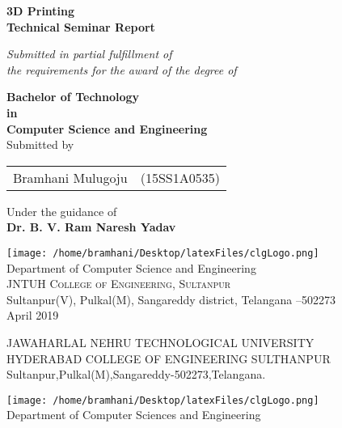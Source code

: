 \documentclass[12pt,a4paper]{report}
\begin{document}
\begin{center}
\Large \textbf {3D Printing}\\[0.5in]
\small {\bf Technical Seminar Report}\vspace{0.5in}

\small \emph{Submitted in partial fulfillment of\\
        the requirements for the award of the degree of}
        \vspace{.2in}

       {\bf Bachelor of Technology \\in\\ Computer Science and Engineering}\\[0.5in]

\normalsize Submitted by \\
\begin{table}[h]
\centering
\begin{tabular}{lr}
Bramhani Mulugoju & (15SS1A0535) \\
\end{tabular}
\end{table}

\vspace{.1in}
Under the guidance of\\
\vspace{.1in}
\textbf{Dr. B. V. Ram Naresh Yadav}\\[0.2in]

\vspace{.3in}

\texttt{[image: /home/bramhani/Desktop/latexFiles/clgLogo.png]}\\[0.1in]
\Large{Department of Computer Science and Engineering}\\
\normalsize
\textsc{JNTUH College of Engineering, Sultanpur}\\
Sultanpur(V), Pulkal(M), Sangareddy district, Telangana --502273 \\
\vspace{0.2cm}
April 2019

\end{center}
\renewcommand\thepage{} %
\newpage

\begin{center}

\begin{large}JAWAHARLAL NEHRU TECHNOLOGICAL UNIVERSITY \\ HYDERABAD COLLEGE OF ENGINEERING SULTHANPUR\\
		Sultanpur,Pulkal(M),Sangareddy-502273,Telangana.\\
\end{large}
\texttt{[image: /home/bramhani/Desktop/latexFiles/clgLogo.png]}\\[0.1in]
	 \noindent
	 Department of Computer Sciences and Engineering \\
\end{center} 
\end{document}
